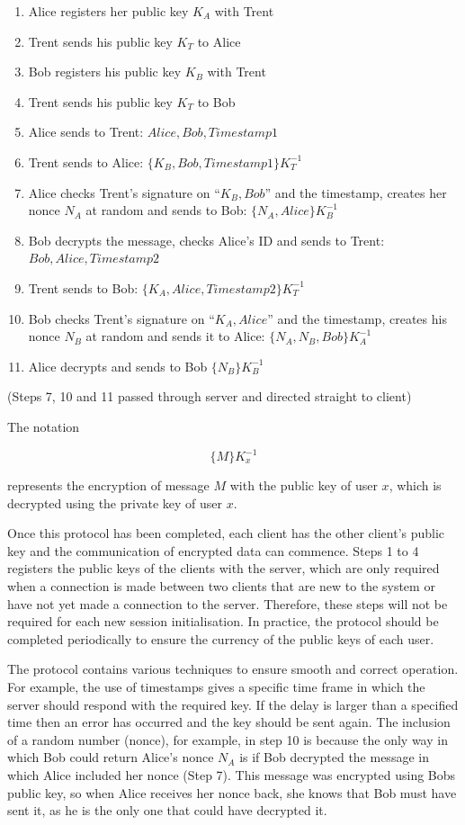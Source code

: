 \documentclass[a4paper,12pt]{report}
\begin{document}
\begin{enumerate}
  \item Alice registers her public key $ K_{A} $ with Trent
  \item Trent sends his public key $ K_{T} $ to Alice
  \item Bob registers his public key $ K_{B} $ with Trent
  \item Trent sends his public key $ K_{T} $ to Bob
  \item Alice sends to Trent: $ Alice, Bob, Timestamp1 $
  \item Trent sends to Alice: $ \{K_{B},Bob, Timestamp1\} K_{T}^{-1} $
  \item Alice checks Trent’s signature on “$ {K_{B},Bob} $” and the timestamp, creates her nonce $ N_{A} $ at random and sends to Bob: $ \{N_{A} , Alice \}K_{B}^{-1} $
  \item Bob decrypts the message, checks Alice’s ID and sends to Trent: $ Bob, Alice, Timestamp2 $
  \item Trent sends to Bob: $ \{K_{A} , Alice, Timestamp2\}K_{T}^{-1} $
  \item Bob checks Trent’s signature on “$ K_{A}, Alice $” and the timestamp, creates his nonce $ N_{B} $ at random and sends it to Alice: $ \{N_{A}, N_{B}, Bob\}K_{A}^{-1} $
  \item Alice decrypts and sends to Bob $ \{N_{B}\}K_{B}^{-1} $
\end{enumerate}

(Steps 7, 10 and 11 passed through server and directed straight to client)

The notation

\[ \{M\}K_{x}^{-1} \]

represents the encryption of message $M$ with the public key of user $x$, which is decrypted using the private key of user $x$.

Once this protocol has been completed, each client has the other client’s public key and the communication of encrypted data can commence. Steps 1 to 4 registers the public keys of the clients with the server, which are only required when a connection is made between two clients that are new to the system or have not yet made a connection to the server. Therefore, these steps will not be required for each new session initialisation. In practice, the protocol should be completed periodically to ensure the currency of the public keys of each user. 

The protocol contains various techniques to ensure smooth and correct operation. For example, the use of timestamps gives a specific time frame in which the server should respond with the required key. If the delay is larger than a specified time then an error has occurred and the key should be sent again. The inclusion of a random number (nonce), for example, in step 10 is because the only way in which Bob could return Alice's nonce $N_{A}$ is if Bob decrypted the message in which Alice included her nonce (Step 7). This message was encrypted using Bobs public key, so when Alice receives her nonce back, she knows that Bob must have sent it, as he is the only one that could have decrypted it. 
\end{document}
